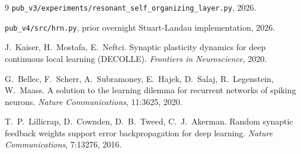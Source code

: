 \documentclass[11pt]{article}
\begin{document}
\begin{thebibliography}{9}
\texttt{pub\_v3/experiments/resonant\_self\_organizing\_layer.py},
2026.

\texttt{pub\_v4/src/hrn.py},
prior overnight Stuart-Landau implementation, 2026.

J.~Kaiser, H.~Mostafa, E.~Neftci.
Synaptic plasticity dynamics for deep continuous local learning (DECOLLE).
\emph{Frontiers in Neuroscience}, 2020.

G.~Bellec, F.~Scherr, A.~Subramoney, E.~Hajek, D.~Salaj, R.~Legenstein,
W.~Maass.
A solution to the learning dilemma for recurrent networks of spiking
neurons.
\emph{Nature Communications}, 11:3625, 2020.

T.~P.~Lillicrap, D.~Cownden, D.~B.~Tweed, C.~J.~Akerman.
Random synaptic feedback weights support error backpropagation for deep
learning.
\emph{Nature Communications}, 7:13276, 2016.
\end{thebibliography}
\end{document}

